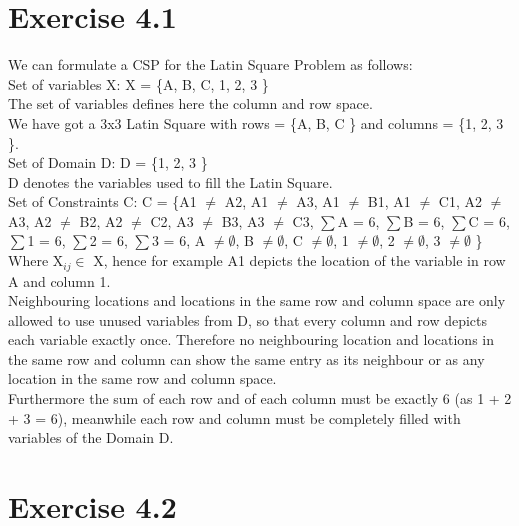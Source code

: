 \documentclass[12pt]{article}
\begin{document}
\section*{Exercise 4.1}
We can formulate a CSP for the Latin Square Problem as follows:\\
Set of variables X: X = \{A, B, C, 1, 2, 3 \}\\
The set of variables defines here the column and row space. \\
We have got a 3x3 Latin Square with rows = \{A, B, C \} and columns = \{1, 2, 3 \}.\\
Set of Domain D: D = \{1, 2, 3 \}\\
D denotes the variables used to fill the Latin Square.\\
Set of Constraints C: C = \{A1 $\neq$ A2, A1 $\neq$ A3, A1 $\neq$ B1, A1 $\neq$ C1, A2 $\neq$ A3, A2 $\neq$ B2, A2 $\neq$ C2, A3 $\neq$ B3, A3 $\neq$ C3, $\sum$A = 6, $\sum$B = 6, $\sum$C = 6, $\sum$1 = 6, $\sum$2 = 6, $\sum$3 = 6, A $\neq \emptyset$, B $\neq \emptyset$, C $\neq \emptyset$, 1 $\neq \emptyset$, 2 $\neq \emptyset$, 3 $\neq \emptyset$ \}\\
Where X$_{ij} \in $ X, hence for example A1 depicts the location of the variable in row A and column 1.\\
Neighbouring locations and locations in the same row and column space are only allowed to use unused variables from D, so that every column and row depicts each variable exactly once. Therefore no neighbouring location and locations in the same row and column can show the same entry as its neighbour or as any location in the same row and column space.\\
Furthermore the sum of each row and of each column must be exactly 6 (as 1 + 2 + 3 = 6), meanwhile each row and column must be completely filled with variables of the Domain D.\\



\section*{Exercise 4.2}
\end{document}
